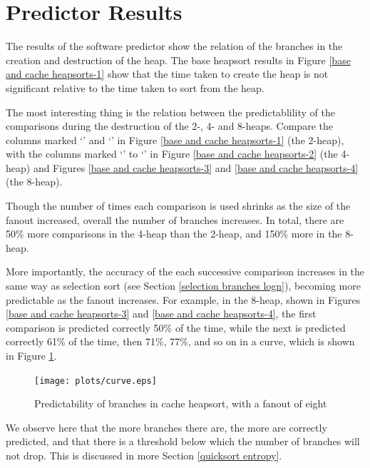 \section{Predictor Results}


The results of the software predictor show the relation of the branches
in the creation and destruction of the heap. The base heapsort results in
Figure \ref{base and cache heapsorts-1} show that the time taken to create the
heap is not significant relative to the time taken to sort from the heap.

The most interesting thing is the relation between the predictablility of the
comparisons during the destruction of the 2-, 4- and 8-heaps. Compare the
columns marked `' and `' in Figure \ref{base and cache heapsorts-1} (the 2-heap), with the
columns marked `' to `' in Figure \ref{base and
cache heapsorts-2} (the 4-heap) and Figures \ref{base and cache heapsorts-3} and
\ref{base and cache heapsorts-4} (the 8-heap).

Though the number of times each comparison is used shrinks
as the size of the fanout increased, overall the number of branches increases.
In total, there are 50\% more comparisons in the 4-heap than the 2-heap, and
150\% more in the 8-heap.

More importantly, the accuracy of the each
successive comparison increases in the same way as selection sort (see Section
\ref{selection branches logn}), becoming more predictable as the fanout
increases. For example, in the 8-heap, shown in Figures \ref{base and cache heapsorts-3}
and \ref{base and cache heapsorts-4},
the first comparison is predicted correctly 50\% of the
time, while the next is predicted correctly 61\% of the time, then 71\%, 77\%, and
so on in a curve, which is shown in Figure \ref{cache heapsort curve}.

\begin{figure}
\texttt{[image: plots/curve.eps]}
\caption{Predictability of branches in cache heapsort, with a fanout of eight}
\label{cache heapsort curve}
\end{figure}

\label{heapsort entropy}
We observe here that the more branches there are, the more are correctly
predicted, and that there is a threshold below which the number of branches will
not drop. This is discussed in more Section \ref{quicksort entropy}.


